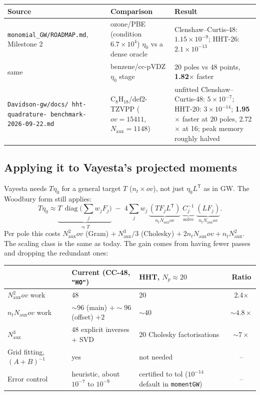 \documentclass[11pt,a4paper]{article}
\newcommand{\code}[1]{\texttt{\small #1}}
\newcommand{\Naux}{N_{\mathrm{aux}}}
\newcommand{\nt}{n_{t}}
\newcommand{\Np}{N_{p}}
\newcommand{\ov}{ov}
\newcommand{\diag}{\operatorname{diag}}
\begin{document}
\begin{center}
\small
\begin{tabularx}{\textwidth}{@{}>{\raggedright\arraybackslash}p{4.3cm}>{\raggedright\arraybackslash}p{4.6cm}L@{}}
\toprule
Source & Comparison & Result \\
\midrule
\code{monomial\_GW/ROADMAP.md}, Milestone 2
  & ozone/PBE (condition $6.7\times10^4$) $\eta_0$ vs a dense oracle
  & Clenshaw--Curtis-48: $1.15\times10^{-9}$; HHT-26: $2.1\times10^{-13}$ \\
same & benzene/cc-pVDZ $\eta_0$ stage & 20 poles vs 48 points, \textbf{1.82$\times$} faster \\
\code{Davidson-gw/docs/ hht-quadrature- benchmark-2026-09-22.md}
  & C$_8$H$_{18}$/def2-TZVPP ($\ov=15411$, $\Naux=1148$)
  & unfitted Clenshaw--Curtis-48: $5\times10^{-7}$; HHT-20: $3\times10^{-14}$;
    \textbf{1.95$\times$} faster at 20 poles, 2.72$\times$ at 16; peak memory roughly halved \\
\bottomrule
\end{tabularx}
\end{center}

\subsection{Applying it to Vayesta's projected moments}

Vayesta needs $T\eta_0$ for a general target $T$ ($\nt\times\ov$), not just
$\eta_0L^{\mathsf T}$ as in GW. The Woodbury form still applies:
\begin{equation}
  T\eta_0 \approx \underbrace{T\,\diag\Big(\sum_j w_jF_j\Big)}_{\approx T}
  \;-\; 4\sum_j w_j\,
  \underbrace{(TF_jL^{\mathsf T})}_{\nt\Naux\ov}\;
  \underbrace{C_j^{-1}}_{\text{solve}}\;
  \underbrace{(LF_j)}_{\nt\Naux\ov}.
\end{equation}
Per pole this costs $\Naux^2\ov$ (Gram) $+\ \Naux^3/3$ (Cholesky)
$+\ 2\nt\Naux\ov + \nt\Naux^2$. The scaling class is the same as today. The gain comes from
having fewer passes and dropping the redundant ones:

\begin{center}
\small
\begin{tabularx}{\textwidth}{@{}>{\raggedright\arraybackslash}p{3.6cm}LLc@{}}
\toprule
& Current (CC-48, \code{"HO"}) & HHT, $\Np\approx20$ & Ratio \\
\midrule
$\Naux^2\ov$ work & 48 & 20 & 2.4$\times$ \\
$\nt\Naux\ov$ work & ${\sim}96$ (main) $+ {\sim}96$ (offset) $+ 2$ & ${\sim}40$ & ${\sim}4.8\times$ \\
$\Naux^3$ & 48 explicit inverses + SVD & 20 Cholesky factorisations & ${\sim}7\times$ \\
Grid fitting, $(A+B)^{-1}$ & yes & not needed & -- \\
Error control & heuristic, about $10^{-7}$ to $10^{-9}$ & certified to tol ($10^{-14}$ default in \code{momentGW}) & -- \\
\bottomrule
\end{tabularx}
\end{center}
\end{document}

